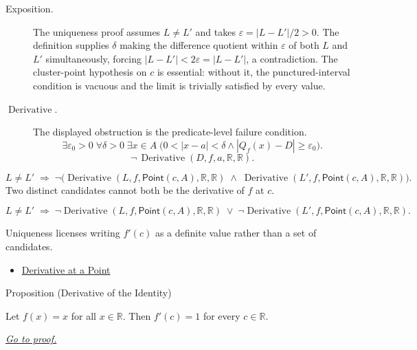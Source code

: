 \begin{remark*}
\begin{description}
  \item[Exposition.]
The uniqueness proof assumes $L \neq L'$ and takes $\varepsilon = |L - L'|/2 > 0$. The definition supplies $\delta$ making the difference quotient within $\varepsilon$ of both $L$ and $L'$ simultaneously, forcing $|L - L'| < 2\varepsilon = |L - L'|$, a contradiction. The cluster-point hypothesis on $c$ is essential: without it, the punctured-interval condition is vacuous and the limit is trivially satisfied by every value.


  \item[\(\operatorname{Derivative}.\)]
  The displayed obstruction is the predicate-level failure condition.
  \[
  \exists\varepsilon_0>0\;\forall\delta>0\;\exists x\in A\;\bigl(0<|x-a|<\delta\land |Q_f(x)-D|\ge\varepsilon_0\bigr).
  \]
  \[
  \neg\,\operatorname{Derivative}(D,f,a,\mathbb{R},\mathbb{R}).
  \]
\end{description}
\end{remark*}

\begin{remark*}[Interpretation]
\[
L \neq L' \;\Rightarrow\;
\neg\bigl(
  \operatorname{Derivative}(L,f,\mathsf{Point}(c,A),\mathbb R,\mathbb R)
  \;\land\;
  \operatorname{Derivative}(L',f,\mathsf{Point}(c,A),\mathbb R,\mathbb R)
\bigr).
\]
Two distinct candidates cannot both be the derivative of $f$ at $c$.


\[
L \neq L'
\;\Longrightarrow\;
\neg\operatorname{Derivative}(L,f,\mathsf{Point}(c,A),\mathbb R,\mathbb R)
\;\lor\;
\neg\operatorname{Derivative}(L',f,\mathsf{Point}(c,A),\mathbb R,\mathbb R).
\]


Uniqueness licenses writing $f'(c)$ as a definite value rather than a set of candidates.
\end{remark*}

\begin{dependencies}
\begin{itemize}
  \item \hyperref[def:derivative-at-a-point]{Derivative at a Point}
\end{itemize}
\end{dependencies}


\begin{propositionbox}{Proposition (Derivative of the Identity)}
\begin{proposition}
\label{prop:derivative-of-the-identity}
Let $f(x) = x$ for all $x \in \mathbb{R}$. Then $f'(c) = 1$ for every $c \in \mathbb{R}$.

\smallskip\noindent
\hyperref[prf:derivative-of-the-identity]{\textit{Go to proof.}}
\end{proposition}
\end{propositionbox}

